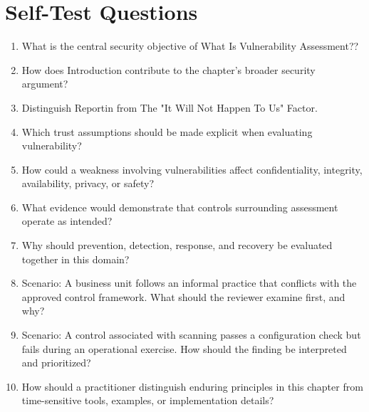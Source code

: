 \documentclass[11pt]{article}
\begin{document}
\section*{Self-Test Questions}
\begin{enumerate}
\item What is the central security objective of What Is Vulnerability Assessment??
\item How does Introduction contribute to the chapter's broader security argument?
\item Distinguish Reportin from The "It Will Not Happen To Us" Factor.
\item Which trust assumptions should be made explicit when evaluating vulnerability?
\item How could a weakness involving vulnerabilities affect confidentiality, integrity, availability, privacy, or safety?
\item What evidence would demonstrate that controls surrounding assessment operate as intended?
\item Why should prevention, detection, response, and recovery be evaluated together in this domain?
\item Scenario: A business unit follows an informal practice that conflicts with the approved control framework. What should the reviewer examine first, and why?
\item Scenario: A control associated with scanning passes a configuration check but fails during an operational exercise. How should the finding be interpreted and prioritized?
\item How should a practitioner distinguish enduring principles in this chapter from time-sensitive tools, examples, or implementation details?
\end{enumerate}
\end{document}
